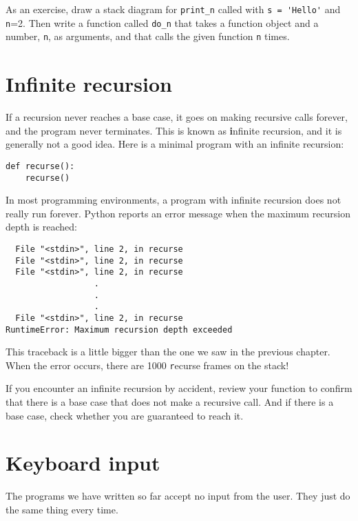 \documentclass[
DIV=11,
fontsize=12,
twoside,
headinclude=false,
titlepage=firstiscover,
abstract=true,
headsepline=true,
footsepline=true,
chapterprefix=true, %
headings=big,
bibliography=totoc,%
captions=tableheading
]{scrbook}
\theoremstyle{definition}
\begin{document}
As an exercise, draw a stack diagram for \verb"print_n" called with
\verb"s = 'Hello'" and {\texttt n=2}.
Then write a function called \verb"do_n" that takes a function
object and a number, {\texttt n}, as arguments, and that calls
the given function {\texttt n} times.


\section{Infinite recursion}

If a recursion never reaches a base case, it goes on making
recursive calls forever, and the program never terminates.  This is
known as {\textbf infinite recursion}, and it is generally not
a good idea.  Here is a minimal program with an infinite recursion:

\begin{lstlisting}
def recurse():
    recurse()
\end{lstlisting}
%
In most programming environments, a program with infinite recursion
does not really run forever.  Python reports an error
message when the maximum recursion depth is reached:

\begin{lstlisting}
  File "<stdin>", line 2, in recurse
  File "<stdin>", line 2, in recurse
  File "<stdin>", line 2, in recurse
                  .   
                  .
                  .
  File "<stdin>", line 2, in recurse
RuntimeError: Maximum recursion depth exceeded
\end{lstlisting}
%
This traceback is a little bigger than the one we saw in the
previous chapter.  When the error occurs, there are 1000
{\texttt recurse} frames on the stack!

If you encounter an infinite recursion by accident, review
your function to confirm that there is a base case that does not
make a recursive call.  And if there is a base case, check whether
you are guaranteed to reach it.


\section{Keyboard input}

The programs we have written so far accept no input from the user.
They just do the same thing every time.
\end{document}
